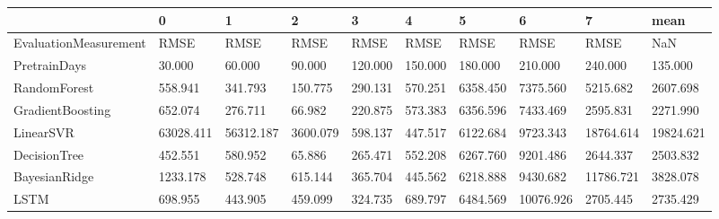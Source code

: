 \begin{tabular}{llllllllll}
\toprule
{} &         0 &         1 &        2 &       3 &       4 &        5 &         6 &         7 &      mean \\
\midrule
EvaluationMeasurement &      RMSE &      RMSE &     RMSE &    RMSE &    RMSE &     RMSE &      RMSE &      RMSE &       NaN \\
PretrainDays          &    30.000 &    60.000 &   90.000 & 120.000 & 150.000 &  180.000 &   210.000 &   240.000 &   135.000 \\
RandomForest          &   558.941 &   341.793 &  150.775 & 290.131 & 570.251 & 6358.450 &  7375.560 &  5215.682 &  2607.698 \\
GradientBoosting      &   652.074 &   276.711 &   66.982 & 220.875 & 573.383 & 6356.596 &  7433.469 &  2595.831 &  2271.990 \\
LinearSVR             & 63028.411 & 56312.187 & 3600.079 & 598.137 & 447.517 & 6122.684 &  9723.343 & 18764.614 & 19824.621 \\
DecisionTree          &   452.551 &   580.952 &   65.886 & 265.471 & 552.208 & 6267.760 &  9201.486 &  2644.337 &  2503.832 \\
BayesianRidge         &  1233.178 &   528.748 &  615.144 & 365.704 & 445.562 & 6218.888 &  9430.682 & 11786.721 &  3828.078 \\
LSTM                  &   698.955 &   443.905 &  459.099 & 324.735 & 689.797 & 6484.569 & 10076.926 &  2705.445 &  2735.429 \\
\bottomrule
\end{tabular}
